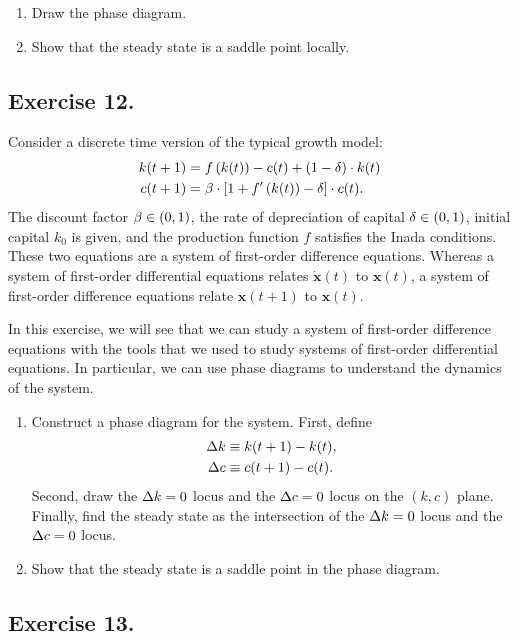 \documentclass[letterpaper,12pt,leqno]{article}
\begin{document}
\begin{enumerate}
\item Draw the phase diagram.
\item Show that the steady state is a saddle point locally.
\end{enumerate}

\subsection*{Exercise 12.}

Consider a discrete time version of the typical growth model:
\begin{align*}
k(t+1) &=f\left( k(t) \right) -c(t) +\left( 1-\delta \right)\cdot  k(t) \\
c(t+1) &=\beta\cdot  \left[  1+f'\left( k(t) \right) -\delta  \right]\cdot  c(t) .
\end{align*} 
The discount factor $\beta \in \left( 0,1 \right)$, the rate of depreciation of capital $\delta \in \left( 0,1 \right)$, initial capital $k_{0}$ is given, and the production function $f$ satisfies the Inada conditions. These two equations are a system of first-order difference equations. Whereas a system of first-order differential equations relates $\bm{\dot{x}}(t) $ to $\bm{x}(t)$, a system of first-order difference equations relate $\bm{x}(t+1) $ to $\bm{x}(t)$.

In this exercise, we will see that we can study a system of first-order difference equations with the tools that we used to study  systems of first-order differential equations. In particular, we can use phase diagrams to understand the dynamics of the system.

\begin{enumerate}
\item Construct a phase diagram for the system. First, define 
\begin{align*}
\Delta k & \equiv k(t+1) -k(t) , \\
\Delta c & \equiv c(t+1) -c(t) .
\end{align*}
Second, draw the $\Delta k=0$ locus and the $\Delta c=0$ locus on the $(k,c)$ plane. Finally, find the steady state as the intersection of the $\Delta k=0$ locus and the $ \Delta c=0$ locus.
\item Show that the steady state is a saddle point in the phase diagram.
\end{enumerate}

\subsection*{Exercise 13.}
\end{document}
